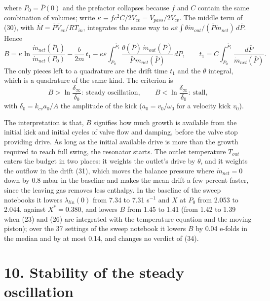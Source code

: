 \documentclass[11pt]{article}
\begin{document}
where $P_0 = \bar P(0)$ and the prefactor collapses because $f$ and $C$ contain the same combination of volumes; write $\kappa \equiv fc^2C/2\bar V_{cv} = \bar V_{pass}/2\bar V_{cv}$. The middle term of (30), with $\bar M = \bar P\bar V_{cv}/RT_{in}$, integrates the same way to $\kappa\varepsilon\int\theta\dot m_{out}/(\bar P\dot m_{net})\,d\bar P$. Hence
\begin{equation}
B = \kappa\ln\frac{\dot m_{net}(\bar P_1)}{\dot m_{net}(P_0)} - \frac{b}{2m}\,t_1 - \kappa\varepsilon\int_{P_0}^{\bar P_1}\frac{\theta(\bar P)\,\dot m_{out}(\bar P)}{\bar P\,\dot m_{net}(\bar P)}\,d\bar P, \qquad t_1 = C\int_{P_0}^{\bar P_1}\frac{d\bar P}{\dot m_{net}(\bar P)} . \tag{33}
\end{equation}
The only pieces left to a quadrature are the drift time $t_1$ and the $\theta$ integral, which is a quadrature of the same kind. The criterion is
\begin{equation}
B > \ln\frac{\delta_\infty}{\delta_0}: \ \text{steady oscillation}, \qquad B < \ln\frac{\delta_\infty}{\delta_0}: \ \text{stall}, \tag{34}
\end{equation}
with $\delta_0 = k_{cv}a_0/A$ the amplitude of the kick ($a_0 = v_0/\omega_0$ for a velocity kick $v_0$).

The interpretation is that, $B$ signifies how much growth is available from the initial kick and initial cycles of valve flow and damping, before the valve stop providing drive. As long as the initial available drive is more than the growth required to reach full swing, the resonator starts. The outlet temperature $T_{out}$ enters the budget in two places: it weights the outlet's drive by $\theta$, and it weights the outflow in the drift (31), which moves the balance pressure where $\dot m_{net} = 0$ down by 0.8 mbar in the baseline and makes the mean drift a few percent faster, since the leaving gas removes less enthalpy. In the baseline of the sweep notebooks it lowers $\lambda_{lin}(0)$ from 7.34 to 7.31 s$^{-1}$ and $X$ at $P_0$ from 2.053 to 2.044, against $X^* = 0.380$, and lowers $B$ from 1.45 to 1.41 (from 1.42 to 1.39 when (23) and (26) are integrated with the temperature equation and the moving piston); over the 37 settings of the sweep notebook it lowers $B$ by 0.04 e-folds in the median and by at most 0.14, and changes no verdict of (34).

\section*{10. Stability of the steady oscillation}
\end{document}
